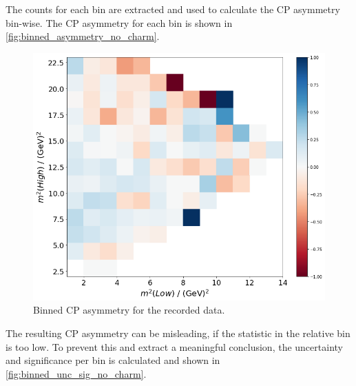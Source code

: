 The counts for each bin are extracted and used to calculate the CP asymmetry bin-wise. The CP asymmetry for each bin is shown in \autoref{fig:binned_asymmetry_no_charm}. 
\begin{figure}
  \centering
  \includegraphics[width = .45\textwidth]{"content/pics/binned_asymmetry_no_charm.png"}
  \caption{Binned CP asymmetry for the recorded data.}
  \label{fig:binned_asymmetry_no_charm}
\end{figure}
The resulting CP asymmetry can be misleading, if the statistic in the relative bin is too low. To prevent this and extract a meaningful conclusion, the uncertainty and significance per bin is calculated and shown in \autoref{fig:binned_unc_sig_no_charm}.
